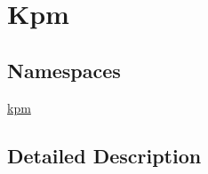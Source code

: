 \hypertarget{group__kpm}{}\section{Kpm}
\label{group__kpm}
\subsection*{Namespaces}
\begin{DoxyCompactItemize}
\item 
 \hyperlink{namespacekpm}{kpm}
\end{DoxyCompactItemize}


\subsection{Detailed Description}
